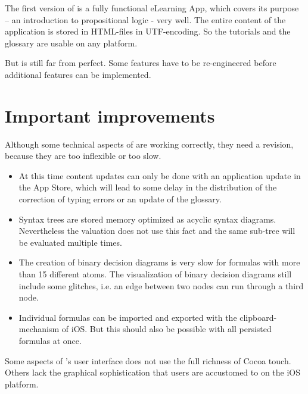 
The first version of \Nyaya is a fully functional eLearning App, 
which covers its purpose – an introduction to propositional logic - very well.
The entire content of the application is stored in HTML-files in UTF-encoding.
So the tutorials and the glossary are usable on any platform.

But \Nyaya is still far from perfect.
Some features have to be re-engineered before additional features can be implemented.



\section{Important improvements}

Although some technical aspects of \Nyaya are working correctly, they need a revision, 
because they are too inflexible or too slow.

\begin{itemize}

\item At this time content updates can only be done with an application update in the App Store,
which will lead to some delay in the distribution of the correction of typing errors or an update of the glossary.

\item Syntax trees are stored memory optimized as acyclic syntax diagrams. 
Nevertheless the valuation does not use this fact and the same sub-tree will be evaluated multiple times.

\item The creation of binary decision diagrams is very slow for formulas with more than 15 different atoms.
The visualization of binary decision diagrams still include some glitches, 
i.e. an edge between two nodes can run through a third node.

\item Individual formulas can be imported and exported with the clipboard-mechanism of iOS. 
But this should also be possible with all persisted formulas at once. 

\end{itemize}

Some aspects of \Nyaya’s user interface does not use the full richness of Cocoa touch. 
Others lack the graphical sophistication that users are accustomed to on the iOS platform.

